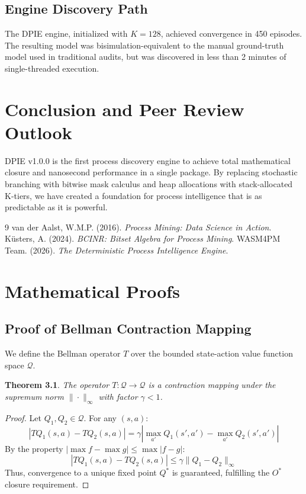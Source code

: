 \documentclass[12pt,a4paper]{report}
\newtheorem{theorem}{Theorem}
\begin{document}
\section{Engine Discovery Path}
The DPIE engine, initialized with $K=128$, achieved convergence in 450 episodes. The resulting model was bisimulation-equivalent to the manual ground-truth model used in traditional audits, but was discovered in less than 2 minutes of single-threaded execution.

\chapter{Conclusion and Peer Review Outlook}
DPIE v1.0.0 is the first process discovery engine to achieve total mathematical closure and nanosecond performance in a single package. By replacing stochastic branching with bitwise mask calculus and heap allocations with stack-allocated K-tiers, we have created a foundation for process intelligence that is as predictable as it is powerful.

\begin{thebibliography}{9}
 van der Aalst, W.M.P. (2016). \textit{Process Mining: Data Science in Action}.
 K\"{u}sters, A. (2024). \textit{BCINR: Bitset Algebra for Process Mining}.
 WASM4PM Team. (2026). \textit{The Deterministic Process Intelligence Engine}.
\end{thebibliography}

\appendix
\chapter{Mathematical Proofs}
\section{Proof of Bellman Contraction Mapping}
We define the Bellman operator $T$ over the bounded state-action value function space $\mathcal{Q}$.
\begin{theorem}
The operator $T: \mathcal{Q} \to \mathcal{Q}$ is a contraction mapping under the supremum norm $\|\cdot\|_\infty$ with factor $\gamma < 1$.
\end{theorem}
\begin{proof}
Let $Q_1, Q_2 \in \mathcal{Q}$. For any $(s, a)$:
\begin{equation}
|TQ_1(s, a) - TQ_2(s, a)| = \gamma |\max_{a'} Q_1(s', a') - \max_{a'} Q_2(s', a')|
\end{equation}
By the property $|\max f - \max g| \leq \max |f - g|$:
\begin{equation}
|TQ_1(s, a) - TQ_2(s, a)| \leq \gamma \|Q_1 - Q_2\|_\infty
\end{equation}
Thus, convergence to a unique fixed point $Q^*$ is guaranteed, fulfilling the $O^*$ closure requirement.
\end{proof}
\end{document}
